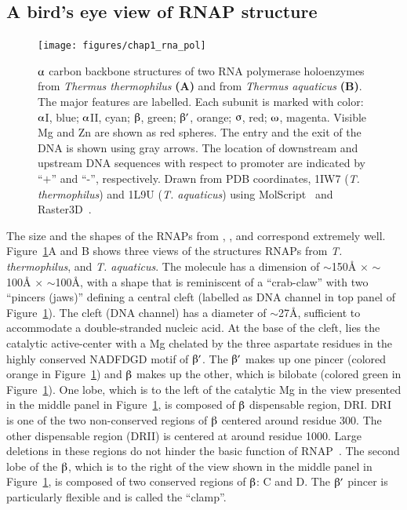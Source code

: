 \subsection{A bird's eye view of RNAP structure}
\label{chap1:RNAP}

\begin{figure}
\begin{narrow}{-1in}{-1in}
\centering
\texttt{[image: figures/chap1\_rna\_pol]}
\end{narrow}
\caption[Structure of RNA polymerase]{$\alphaup$ carbon backbone
structures of two RNA polymerase holoenzymes from \emph{Thermus
thermophilus} \textbf{(A)} and from \emph{Thermus aquaticus}
\textbf{(B)}. The major features are labelled. Each subunit is
marked with color: $\alphaup$I, blue; $\alphaup$II, cyan;
$\betaup$, green; $\betaup'$, orange; $\sigmaup$, red; $\omegaup$,
magenta. Visible Mg and Zn are shown
as red spheres. The entry and the exit of the DNA is shown using
gray arrows. The location of downstream and upstream DNA sequences
with respect to promoter are indicated by ``$+$'' and ``-'',
respectively.  Drawn from PDB coordinates, 1IW7 (\emph{T.
thermophilus}) and 1L9U (\emph{T. aquaticus}) using
MolScript~\citep{Esnouf1997} and Raster3D~\citep{Merrit1997}.}
\label{rna_pol_structure}
\end{figure}


The size and the shapes of the RNAPs from , , and  correspond extremely well.
Figure~\ref{rna_pol_structure}A and B shows three views of the
structures RNAPs from \emph{T. thermophilus}, and \emph{T.
aquaticus}. The molecule has a dimension of \U{$\sim$150}{\AA}
$\times$ \U{$\sim$100}{\AA} $\times$ \U{$\sim$100}{\AA}, with a
shape that is reminiscent of a ``crab-claw'' with two ``pincers
(jaws)'' defining a central cleft (labelled as DNA channel in top
panel of Figure~\ref{rna_pol_structure}). The cleft (DNA channel)
has a diameter of \U{$\sim$27}{\AA}, sufficient to accommodate a
double-stranded nucleic acid. At the base of the cleft, lies the
catalytic active-center with a Mg chelated by the three
aspartate residues in the highly conserved NADFDGD motif of
$\betaup'$. The $\betaup'$ makes up one pincer (colored orange in
Figure~\ref{rna_pol_structure}) and $\betaup$ makes up the other,
which is bilobate (colored green in
Figure~\ref{rna_pol_structure}). One lobe, which is to the left of
the catalytic Mg in the view presented in the middle
panel in Figure~\ref{rna_pol_structure}, is composed of $\betaup$
dispensable region, DRI\@. DRI is one of the two non-conserved
regions of $\betaup$ centered around residue 300. The other
dispensable region (DRII) is centered at around residue 1000.
Large deletions in these regions do not hinder the basic function
of RNAP~\citep{Severinov1992,Severinov1994}. The second lobe of
the $\betaup$, which is to the right of the view shown in the
middle panel in Figure~\ref{rna_pol_structure}, is composed of two
conserved regions of $\betaup$: C and D. The $\betaup'$ pincer is
particularly flexible and is called the ``clamp''.




